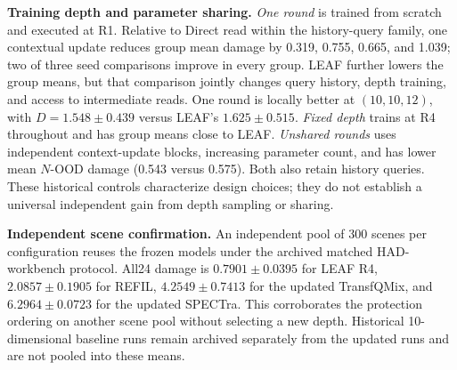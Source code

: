 \noindent\textbf{Training depth and parameter sharing.}
\emph{One round} is trained from scratch and executed at R1. Relative to Direct read within the history-query family, one contextual update reduces group mean damage by 0.319, 0.755, 0.665, and 1.039; two of three seed comparisons improve in every group. LEAF further lowers the group means, but that comparison jointly changes query history, depth training, and access to intermediate reads. One round is locally better at $(10,10,12)$, with $D=1.548\pm0.439$ versus LEAF's $1.625\pm0.515$. \emph{Fixed depth} trains at R4 throughout and has group means close to LEAF. \emph{Unshared rounds} uses independent context-update blocks, increasing parameter count, and has lower mean $N$-OOD damage (0.543 versus 0.575). Both also retain history queries. These historical controls characterize design choices; they do not establish a universal independent gain from depth sampling or sharing.


\noindent\textbf{Independent scene confirmation.}
An independent pool of 300 scenes per configuration reuses the frozen models under the archived matched HAD-workbench protocol. All24 damage is $0.7901\pm0.0395$ for LEAF R4, $2.0857\pm0.1905$ for REFIL, $4.2549\pm0.7413$ for the updated TransfQMix, and $6.2964\pm0.0723$ for the updated SPECTra. This corroborates the protection ordering on another scene pool without selecting a new depth. Historical 10-dimensional baseline runs remain archived separately from the updated runs and are not pooled into these means.

